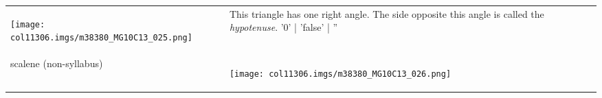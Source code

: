 \begin{table}[H]
\begin{center}
\begin{xtabular*}{\mytablewidth}[t]{|p{10\mystarwidth}|p{10\mystarwidth}|p{
10\mystarwidth}|}
\begin{center}
\label{m38380*id317628!!!underscore!!!media}\label{
m38380*id317628!!!underscore!!!printimage}\texttt{[image: col11306.imgs/m38380\_MG10C13\_025.png]} %
        
      \vspace{2pt}
    \vspace{.1in}
    
    \end{center}



    \addtocounter{footnote}{-0}
    
                 &
    
    
        This triangle has one right angle. The side opposite this angle is
called the \textsl{hypotenuse}.%
'0' | 'false' | ''
     \tabularnewline{}
    
    
        scalene (non-syllabus) &
    
    
        
                  
    \setcounter{subfigure}{0}

\label{m38380*id317668}
    \begin{center}
   
\label{m38380*id317668!!!underscore!!!media}\label{
m38380*id317668!!!underscore!!!printimage}\texttt{[image: col11306.imgs/m38380\_MG10C13\_026.png]} %
        
      \vspace{2pt}
    \vspace{.1in}
    
    \end{center}



    \addtocounter{footnote}{-0}
    

\end{xtabular*}
\end{center}
\end{table}
